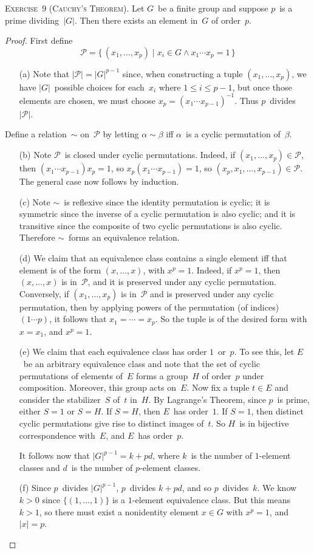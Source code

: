 \documentclass[letterpaper]{article}
\newcommand{\exercise}[1]{\goodbreak\noindent\textsc{Exercise~{#1}.}}
\renewcommand{\P}{\mathcal{P}}
\newcommand{\ord}[1]{|{#1}|}
\begin{document}
\exercise{9 (Cauchy's Theorem)}
Let $G$~be a finite group and suppose $p$~is a prime dividing~$\ord{G}$. Then there exists an element in~$G$ of order~$p$.
\begin{proof}
First define
$$\P=\{\,(x_1,\ldots,x_p)\mid x_i\in G\land x_1\cdots x_p=1\,\}$$
\begin{enumerate}[itemsep=0pt]
\item[(a)] Note that $\ord{\P}=\ord{G}^{p-1}$ since, when constructing a tuple $(x_1,\ldots,x_p)$, we have $\ord{G}$~possible choices for each~$x_i$ where $1\le i\le p-1$, but once those elements are chosen, we must choose $x_p=(x_1\cdots x_{p-1})^{-1}$. Thus $p$~divides~$\ord{\P}$.
\end{enumerate}
Define a relation~$\sim$ on~$\P$ by letting $\alpha\sim\beta$ iff $\alpha$~is a cyclic permutation of~$\beta$.
\begin{enumerate}[itemsep=0pt]
\item[(b)] Note $\P$~is closed under cyclic permutations. Indeed, if $(x_1,\ldots,x_p)\in\P$, then $(x_1\cdots x_{p-1})x_p=1$, so $x_p(x_1\cdots x_{p-1})=1$, so $(x_p,x_1,\ldots,x_{p-1})\in\P$. The general case now follows by induction.
\item[(c)] Note $\sim$~is reflexive since the identity permutation is cyclic; it is symmetric since the inverse of a cyclic permutation is also cyclic; and it is transitive since the composite of two cyclic permutations is also cyclic. Therefore $\sim$~forms an equivalence relation.
\item[(d)] We claim that an equivalence class contains a single element iff that element is of the form $(x,\ldots,x)$, with $x^p=1$. Indeed, if $x^p=1$, then $(x,\ldots,x)$ is in~$\P$, and it is preserved under any cyclic permutation. Conversely, if $(x_1,\ldots,x_p)$ is in~$\P$ and is preserved under any cyclic permutation, then by applying powers of the permutation (of indices) $(1\cdots p)$, it follows that $x_1=\cdots=x_p$. So the tuple is of the desired form with $x=x_1$, and $x^p=1$.
\item[(e)] We claim that each equivalence class has order $1$~or~$p$. To see this, let $E$~be an arbitrary equivalence class and note that the set of cyclic permutations of elements of~$E$ forms a group~$H$ of order~$p$ under composition. Moreover, this group acts on~$E$. Now fix a tuple $t\in E$ and consider the stabilizer~$S$ of~$t$ in~$H$. By Lagrange's Theorem, since $p$~is prime, either $S=1$ or $S=H$. If $S=H$, then $E$~has order~$1$. If $S=1$, then distinct cyclic permutations give rise to distinct images of~$t$. So $H$~is in bijective correspondence with~$E$, and $E$~has order~$p$.

It follows now that $\ord{G}^{p-1}=k+pd$, where $k$~is the number of $1$-element classes and $d$~is the number of $p$-element classes.

\item[(f)] Since $p$~divides $\ord{G}^{p-1}$, $p$~divides $k+pd$, and so $p$~divides~$k$. We know $k>0$ since $\{(1,\ldots,1)\}$ is a $1$-element equivalence class. But this means $k>1$, so there must exist a nonidentity element $x\in G$ with $x^p=1$, and $\ord{x}=p$.
\end{enumerate}
\end{proof}
\end{document}
